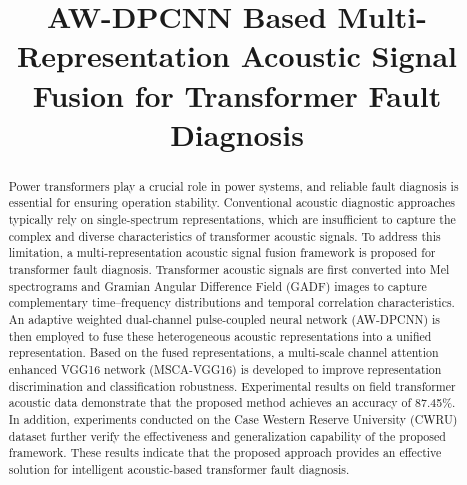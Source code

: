 \documentclass[anonymous]{iopjournal}
\begin{document}
\title{AW-DPCNN Based Multi-Representation Acoustic Signal Fusion for Transformer Fault Diagnosis}

\begin{abstract}
Power transformers play a crucial role in power systems, and reliable fault diagnosis is essential for ensuring operation stability. Conventional acoustic diagnostic approaches typically rely on single-spectrum representations, which are insufficient to capture the complex and diverse characteristics of transformer acoustic signals. To address this limitation, a multi-representation acoustic signal fusion framework is proposed for transformer fault diagnosis. Transformer acoustic signals are first converted into Mel spectrograms and Gramian Angular Difference Field (GADF) images to capture complementary time–frequency distributions and temporal correlation characteristics. An adaptive weighted dual-channel pulse-coupled neural network (AW-DPCNN) is then employed to fuse these heterogeneous acoustic representations into a unified representation. Based on the fused representations, a multi-scale channel attention enhanced VGG16 network (MSCA-VGG16) is developed to improve representation discrimination and classification robustness. Experimental results on field transformer acoustic data demonstrate that the proposed method achieves an accuracy of 87.45\%. In addition, experiments conducted on the Case Western Reserve University (CWRU) dataset further verify the effectiveness and generalization capability of the proposed framework. These results indicate that the proposed approach provides an effective solution for intelligent acoustic-based transformer fault diagnosis.
\end{abstract}
\end{document}
